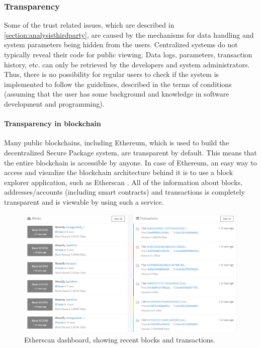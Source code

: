 \subsubsection{Transparency} \label{section:transparency}

Some of the trust related issues, which are described in \ref{section:analysisthirdparty}, are caused by the mechanisms for data handling and system parameters being hidden from the users. Centralized systems do not typically reveal their code for public viewing. Data logs, parameters, transaction history, etc. can only be retrieved by the developers and system administrators. Thus, there is no possibility for regular users to check if the system is implemented to follow the guidelines, described in the terms of conditions (assuming that the user has some background and knowledge in software development and programming).

\paragraph{Transparency in blockchain} 
Many public blockchains, including Ethereum, which is used to build the decentralized Secure Package system, are transparent by default. This means that the entire blockchain is accessible by anyone. In case of Ethereum, an easy way to access and visualize the blockchain architecture behind it is to use a block explorer application, such as Etherscan \citep{etherscan}. All of the information about blocks, addresses/accounts (including smart contracts) and transactions is completely transparent and is viewable by using such a service.

\begin{figure}[H]
\centering
\includegraphics[scale=0.55]{images/etherscan.png}
\caption{Etherscan dashboard, showing recent blocks and transactions.}
\label{fig:etherscanrecent}
\end{figure}

